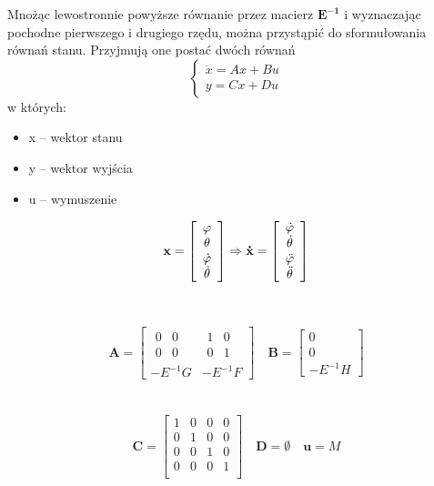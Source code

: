Mnożąc lewostronnie powyższe równanie przez macierz $\mathbf{E^{-1}}$ i wyznaczając pochodne pierwszego i drugiego rzędu, można przystąpić do sformułowania równań stanu. Przyjmują one postać dwóch równań
\begin{equation}
    \left\{
    \begin{array}{ll}
    \dot{x} = Ax + Bu \\
    y = Cx + Du
    \end{array}
    \right.
\end{equation}
w których:
\begin{itemize}
    \item x -- wektor stanu
    \item y -- wektor wyjścia
    \item u -- wymuszenie
\end{itemize}

$$
\mathbf{x} =
\left[ \begin{array}{c}
\varphi \\
\theta \\
\dot{\varphi} \\
\dot{\theta}
\end{array} \right]
\Rightarrow
\mathbf{\dot{x}} =
\left[ \begin{array}{c}
\dot{\varphi} \\
\dot{\theta} \\
\Ddot{\varphi} \\
\Ddot{\theta}
\end{array} \right]
$$
\\ \\
$$
\mathbf{A} =
\left[ \begin{array}{c|ccc}
\begin{array}{cc}
0 & 0 \\
0 & 0
\end{array}
& 
\begin{array}{cc}
1 & 0 \\
0 & 1
\end{array} \\
\hline
-E^{-1}G & -E^{-1}F
\end{array} \right] 
\quad
\mathbf{B} =
\left[ \begin{array}{c}
0 \\
0 \\
-E^{-1}H
\end{array} \right] 
$$
\\ \\
$$
\mathbf{C} =
\left[ \begin{array}{cccc}
1 & 0 & 0 & 0 \\
0 & 1 & 0 & 0 \\
0 & 0 & 1 & 0 \\
0 & 0 & 0 & 1 \\
\end{array} \right] 
\quad
\mathbf{D} = \emptyset
\quad
\mathbf{u} = M
$$

